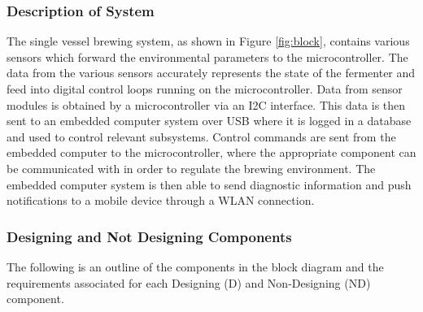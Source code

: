 \documentclass{article}
\begin{document}
\subsubsection{Description of System}
The single vessel brewing system, as shown in Figure \ref{fig:block}, contains various sensors which forward the environmental parameters to the microcontroller. The data from the various sensors accurately represents the state of the fermenter and feed into digital control loops running on the microcontroller.  Data from sensor modules is obtained by a microcontroller via an I2C interface. This data is then sent to an embedded computer system over USB where it is logged in a database and used to control relevant subsystems. Control commands are sent from the embedded computer to the microcontroller, where the appropriate component can be communicated with in order to regulate the brewing environment.  The embedded computer system is then able to send diagnostic information and push notifications to a mobile device through a WLAN connection.

\subsubsection{Designing and Not Designing Components}
The following is an outline of the components in the block diagram and the requirements associated for each Designing (D) and Non-Designing (ND) component.
\end{document}
